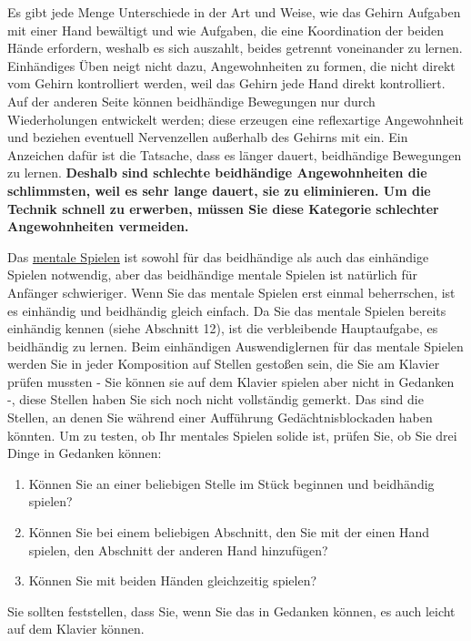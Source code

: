 Es gibt jede Menge Unterschiede in der Art und Weise, wie das Gehirn Aufgaben mit einer Hand bewältigt und wie Aufgaben, die eine Koordination der beiden Hände erfordern, weshalb es sich auszahlt, beides getrennt voneinander zu lernen.
Einhändiges Üben neigt nicht dazu, Angewohnheiten zu formen, die nicht direkt vom Gehirn kontrolliert werden, weil das Gehirn jede Hand direkt kontrolliert.
Auf der anderen Seite können beidhändige Bewegungen nur durch Wiederholungen entwickelt werden; diese erzeugen eine reflexartige Angewohnheit und beziehen eventuell Nervenzellen außerhalb des Gehirns mit ein.
Ein Anzeichen dafür ist die Tatsache, dass es länger dauert, beidhändige Bewegungen zu lernen.
\textbf{Deshalb sind schlechte beidhändige Angewohnheiten die schlimmsten, weil es sehr lange dauert, sie zu eliminieren.
Um die Technik schnell zu erwerben, müssen Sie diese Kategorie schlechter Angewohnheiten vermeiden.}

Das \hyperref[c1ii12mental]{mentale Spielen} ist sowohl für das beidhändige als auch das einhändige Spielen notwendig, aber das beidhändige mentale Spielen ist natürlich für Anfänger schwieriger.
Wenn Sie das mentale Spielen erst einmal beherrschen, ist es einhändig und beidhändig gleich einfach.
Da Sie das mentale Spielen bereits einhändig kennen (siehe Abschnitt 12), ist die verbleibende Hauptaufgabe, es beidhändig zu lernen.
Beim einhändigen Auswendiglernen für das mentale Spielen werden Sie in jeder Komposition auf Stellen gestoßen sein, die Sie am Klavier prüfen mussten - Sie können sie auf dem Klavier spielen aber nicht in Gedanken -, diese Stellen haben Sie sich noch nicht vollständig gemerkt.
Das sind die Stellen, an denen Sie während einer Aufführung Gedächtnisblockaden haben könnten.
Um zu testen, ob Ihr mentales Spielen solide ist, prüfen Sie, ob Sie drei Dinge in Gedanken können:

\begin{enumerate}[label={\arabic*.}] 
 \item Können Sie an einer beliebigen Stelle im Stück beginnen und beidhändig spielen?
 \item Können Sie bei einem beliebigen Abschnitt, den Sie mit der einen Hand spielen, den Abschnitt der anderen Hand hinzufügen?
 \item Können Sie mit beiden Händen gleichzeitig spielen?
 \end{enumerate}
Sie sollten feststellen, dass Sie, wenn Sie das in Gedanken können, es auch leicht auf dem Klavier können.

